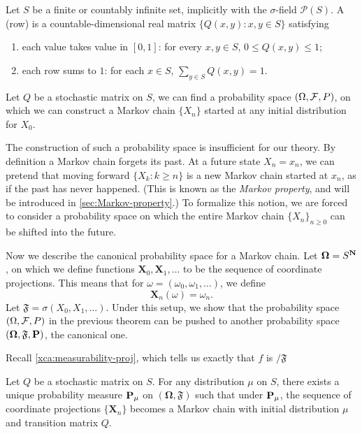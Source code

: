 \documentclass[10pt]{book}
\begin{document}
Let $S$ be a finite or countably infinite set, implicitly with the $\sigma$-field $\mathcal P(S)$. A (row)  is a countable-dimensional real matrix $\{Q(x,y):x,y\in S\}$ satisfying \begin{enumerate}
    \item each value takes value in $[0,1]$: for every $x,y\in S$, $0 \leq Q(x,y) \leq 1$;
    \item each row sums to $1$: for each $x \in S$, $\sum_{y\in S} Q(x,y) = 1$.
\end{enumerate}

\begin{thm}
    Let $Q$ be a stochastic matrix on $S$, we can find a probability space $(\Omega,\mathcal{F},P)$, on which we can construct a Markov chain $\{X_n\}$ started at any initial distribution for $X_0$.
\end{thm}

The construction of such a probability space is insufficient for our theory. By definition a Markov chain forgets its past. At a future state $X_n = x_n$, we can  pretend that moving forward $\{X_k:k\geq n\}$ is a new Markov chain started at $x_n$, as if the past has never happened. (This is known as the \emph{Markov property}, and will be introduced in \cref{sec:Markov-property}.) To formalize this notion, we are forced to consider a probability space on which the entire Markov chain $\{X_n\}_{n\geq 0}$ can be shifted into the future.

Now we describe the canonical probability space for a Markov chain. Let $\mathbf \Omega = S^{\mathbf{N}}$, on which we define functions $\mathbf X_0, \mathbf X_1,\dots$ to be the sequence of coordinate projections. This means that for $\omega = (\omega_0,\omega_1,\dotsc)$, we define \[
    \mathbf X_n(\omega) = \omega_n.
\]
Let $\mathfrak F = \sigma(X_0,X_1,\dotsc)$. Under this setup, we show that the probability space $(\Omega,\mathcal{F},P)$ in the previous theorem can be pushed to another probability space $(\mathbf \Omega,\mathfrak F,\mathbf{P})$, the canonical one.


Recall \cref{xca:measurability-proj}, which tells us exactly that $f$ is $/\mathfrak F$

\begin{thm}
    Let $Q$ be a stochastic matrix on $S$. For any distribution $\mu$ on $S$, there exists a unique probability measure $\mathbf{P}_\mu$ on $(\mathbf \Omega,\mathfrak F)$ such that under $\mathbf{P}_\mu$, the sequence of coordinate projections $\{\mathbf X_n\}$ becomes a Markov chain with initial distribution $\mu$ and transition matrix $Q$.
\end{thm}
\end{document}
